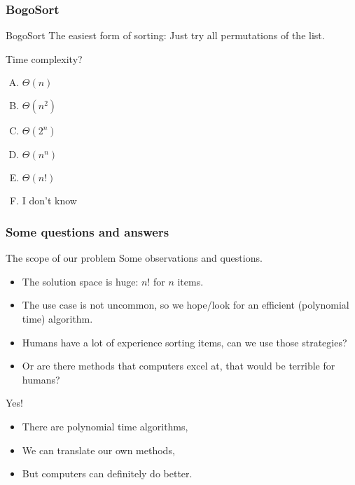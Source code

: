 \begin{frame}
	\frametitle{BogoSort}
		\begin{block}{BogoSort}
			The easiest form of sorting: Just try all permutations of the list.
		\end{block}	
		\pause
		\begin{questionblock}{Time complexity?}
			\begin{enumerate}[A.]
				\item $\Theta(n)$
				\item $\Theta(n^2)$
				\item $\Theta(2^n)$
				\item $\Theta(n^n)$
				\item $\Theta(n!)$
				\item I don't know
			\end{enumerate}
		\end{questionblock}
	
\end{frame}

\begin{frame}
	\frametitle{Some questions and answers}
\begin{block}{The scope of our problem}
	Some observations and questions.
	\begin{itemize}
		\item The solution space is huge: $n!$ for $n$ items.
			\pause
		\item The use case is not uncommon, so we hope/look for an efficient (polynomial time) algorithm.
			\pause
		\item Humans have a lot of experience sorting items, can we use those strategies?
			\pause
		\item Or are there methods that computers excel at, that would be terrible for humans?
	\end{itemize}
\end{block}	
\pause
\begin{answerblock}{Yes!}
	\begin{itemize}
		\item There are polynomial time algorithms,
			\pause
		\item We can translate our own methods,
		\item But computers can definitely do better.
	\end{itemize}
\end{answerblock}
\end{frame}

